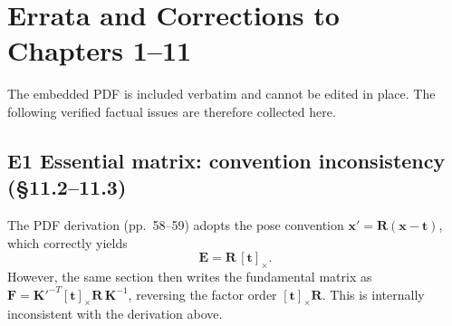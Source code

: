 \documentclass[12pt,a4paper]{report}
\newcommand{\vect}[1]{\mathbf{#1}}
\begin{document}





\chapter*{Errata and Corrections to Chapters 1--11}

The embedded PDF is included verbatim and cannot be edited in place.
The following verified factual issues are therefore collected here.

\section*{E1 \quad Essential matrix: convention inconsistency (\S 11.2--11.3)}

The PDF derivation (pp.~58--59) adopts the pose convention
$\vect{x}' = \vect{R}(\vect{x} - \vect{t})$, which correctly yields
\[
    \vect{E} = \vect{R}\,[\vect{t}]_\times .
\]
However, the same section then writes the fundamental matrix as
$\vect{F} = \vect{K}'^{-T}[\vect{t}]_\times\vect{R}\,\vect{K}^{-1}$,
reversing the factor order $[\vect{t}]_\times \vect{R}$.
This is internally inconsistent with the derivation above.
\end{document}
